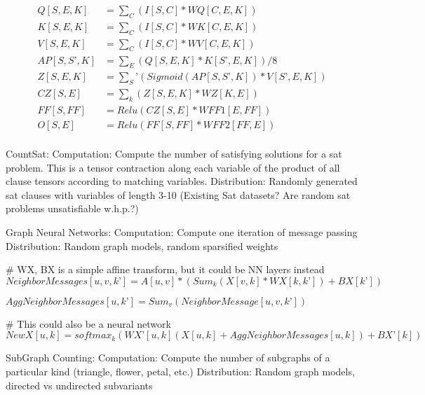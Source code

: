 \documentclass{article}
\begin{document}
 \begin{align*}
Q[S, E, K] &= \sum_C(I[S, C] * WQ[C, E, K])\\
K[S, E, K] &= \sum_C(I[S, C] * WK[C, E, K])\\
V[S, E, K] &= \sum_C(I[S, C] * WV[C, E, K])\\
AP[S, S’, K] &= \sum_E(Q[S, E, K] * K[S’, E, K]) / 8\\
Z[S, E, K] &= \sum_S’(Sigmoid(AP[S,S’,K]) * V[S’, E, K])\\
CZ[S, E] &= \sum_k(Z[S, E, K] * WZ[K,E])\\
FF[S,FF] &= Relu(CZ[S,E] * WFF1[E,FF])\\
O[S,E] &= Relu(FF[S,FF] * WFF2[FF,E])\\
\end{align*}

CountSat:
	Computation: Compute the number of satisfying solutions for a sat problem. This is a tensor contraction along each variable of the product of all clause tensors according to matching variables.
	Distribution: Randomly generated sat clauses with variables of length 3-10 (Existing Sat datasets? Are random sat problems unsatisfiable w.h.p.?)

Graph Neural Networks:
	Computation: Compute one iteration of message passing
	Distribution: Random graph models, random sparsified weights

# WX, BX is a simple affine transform, but it could be NN layers instead
$NeighborMessages[u, v, k’] = A[u, v]*(Sum_k(X[v, k]*WX[k, k’]) +BX[k’])  $

$AggNeighborMessages[u, k’] = Sum_v(NeighborMessage[u, v, k’])$

# This could also be a neural network
$NewX[u, k] = softmax_k(WX’[u,k](X[u, k] +AggNeighborMessages[u,k]) + BX’[k]) $

SubGraph Counting:
	Computation: Compute the number of subgraphs of a particular kind (triangle, flower, petal, etc.)
	Distribution: Random graph models, directed vs undirected subvariants




\end{document}

